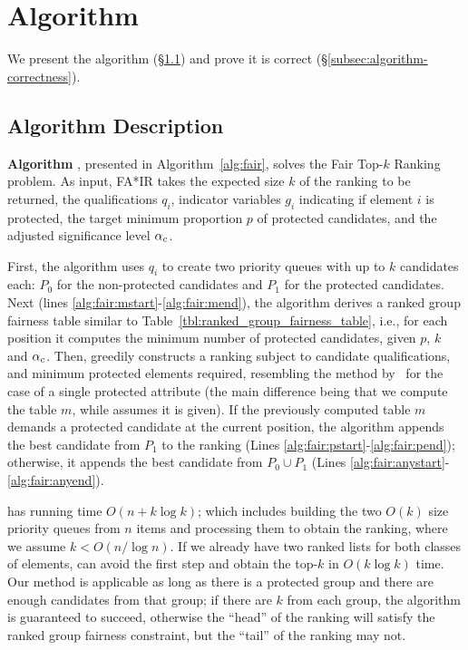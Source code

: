 \section{Algorithm}\label{sec:algorithms}
We present the \algoFAIR algorithm (\S\ref{subsec:algorithm-description}) and prove it is correct (\S\ref{subsec:algorithm-correctness}).

\subsection{Algorithm Description}\label{subsec:algorithm-description}

\textbf{Algorithm \algoFAIRBF}, presented in Algorithm~\ref{alg:fair}, solves the {\sc Fair Top-$k$ Ranking} problem.
%
As input, FA*IR takes 
the expected size $k$ of the ranking to be returned,
the qualifications $q_i$, 
indicator variables $g_i$ indicating if element $i$ is protected,
the target minimum proportion $p$ of protected candidates, and
the adjusted significance level $\alpha_c$.

First, the algorithm uses $q_i$ to create two priority queues with up to $k$ candidates each: $P_0$ for the non-protected candidates and $P_1$ for the protected candidates.
%
Next (lines \ref{alg:fair:mstart}-\ref{alg:fair:mend}), the algorithm derives a ranked group fairness table similar to Table~\ref{tbl:ranked_group_fairness_table}, i.e., for each position it computes the minimum number of protected candidates, given $p$, $k$ and $\alpha_c$.
%
Then, \algoFAIR greedily constructs a ranking subject to candidate qualifications, and minimum protected elements required, resembling the method by~\citet{celis2017ranking} for the case of a single protected attribute (the main difference being that we compute the table $m$, while \cite{celis2017ranking} assumes it is given).
%
If the previously computed table $m$ demands a protected candidate at the current position, the algorithm appends the best candidate from $P_1$ to the ranking (Lines \ref{alg:fair:pstart}-\ref{alg:fair:pend}); otherwise, it appends the best candidate from $P_0 \cup P_1$ (Lines \ref{alg:fair:anystart}-\ref{alg:fair:anyend}).

\algoFAIR has running time $O(n + k \log k)$; which includes building the two $O(k)$ size priority queues from $n$ items and processing them to obtain the ranking, where we assume $k < O(n/\log n)$. 
%
If we already have two ranked lists for both classes of elements, \algoFAIR can avoid the first step and obtain the top-$k$ in $O(k \log k)$ time.
%
Our method is applicable as long as there is a protected group and there are enough candidates from that group; if there are $k$ from each group, the algorithm is guaranteed to succeed, otherwise the ``head'' of the ranking will satisfy the ranked group fairness constraint, but the ``tail'' of the ranking may not.

